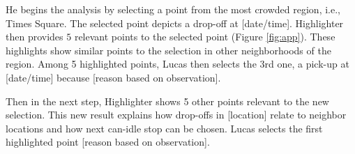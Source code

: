 He begins the analysis by selecting a point from the most crowded region, i.e., Times Square. The selected point depicts a drop-off at [date/time]. {\sc Highlighter} then provides $5$ relevant points to the selected point (Figure \ref{fig:app}). These highlights show similar points to the selection in other neighborhoods of the region. Among 5 highlighted points, Lucas then selects the 3rd one, a pick-up at [date/time] because [reason based on observation].

Then in the next step, {\sc Highlighter} shows 5 other points relevant to the new selection. This new result explains how drop-offs in [location] relate to neighbor locations and how next can-idle stop can be chosen. Lucas selects the first highlighted point [reason based on observation].